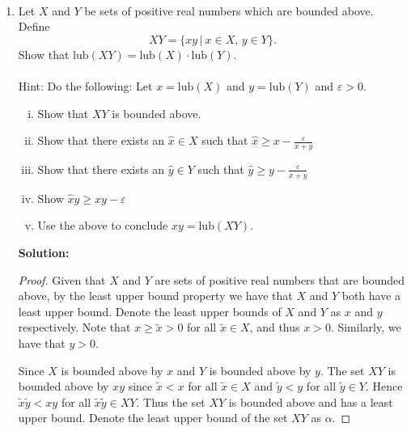 \documentclass[12pt,letterpaper]{article}
\newcommand{\lub}{\text{lub}}
\theoremstyle{plain}
\theoremstyle{definition}
\begin{document}
\ \\
\begin{enumerate}[1.]
\item Let $X$ and $Y$ be sets of positive real numbers which are bounded above. Define \[XY=\{xy\, |\ x\in X,\, y\in Y\}.\] Show that $\lub(XY)=\lub(X)\cdot \lub(Y)$.  \\
\ \\
Hint: Do the following: 
Let $x=\lub(X)$ and $y=\lub(Y)$ and $\varepsilon>0$. 
\begin{enumerate}[(i)]
\item Show that $XY$ is bounded above.
\item Show that there exists an $\hat{x}\in X$ such that $\hat{x}\geq x-\frac{\varepsilon}{x+y}$
\item Show that there exists an $\hat{y}\in Y$ such that $\hat{y}\geq y-\frac{\varepsilon}{x+y}$
\item Show $\hat{x}\hat{y}\geq xy-\varepsilon$
\item Use the above to conclude $xy=\lub(XY)$.\\
\end{enumerate}
{\bf Solution:}
\begin{proof} Given that $X$ and $Y$ are sets of positive real numbers that are bounded above, by the least upper bound property we have that $X$ and $Y$ both have a least upper bound. Denote the least upper bounds of $X$ and $Y$ as $x$ and $y$ respectively. Note that $x\geq \tilde{x}>0$ for all $\tilde{x}\in X$, and thus $x>0$. Similarly, we have that $y>0$. 

Since $X$ is bounded above by $x$ and $Y$ is bounded above by $y$. The set $XY$ is bounded above by $xy$ since $\tilde{x}<x$ for all $\tilde{x}\in X$ and $\tilde{y}<y$ for all $\tilde{y}\in Y$. Hence  $\tilde{x}\tilde{y}<xy$ for all $\tilde{x}\tilde{y} \in XY$.  Thus the set $XY$ is bounded above and has a least upper bound. Denote the least upper bound of the set $XY$ as $\alpha$. 


\end{proof}
\end{enumerate}
\end{document}
